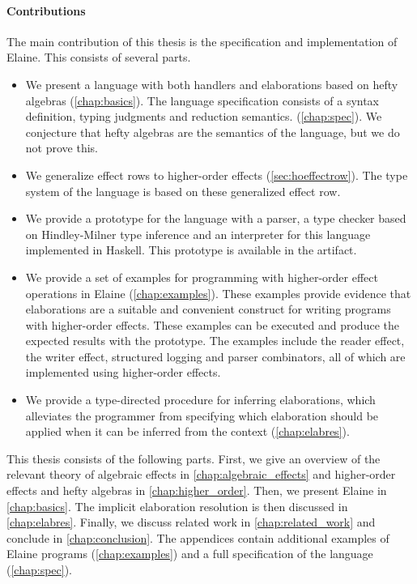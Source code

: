 \paragraph{Contributions} The main contribution of this thesis is the specification and implementation of Elaine. This consists of several parts.
%
\begin{itemize}
    \item We present a language with both handlers and elaborations based on hefty algebras (\cref{chap:basics}). The language specification consists of a syntax definition, typing judgments and reduction semantics. (\cref{chap:spec}). We conjecture that hefty algebras are the semantics of the language, but we do not prove this.
    \item We generalize effect rows to higher-order effects (\cref{sec:hoeffectrow}). The type system of the language is based on these generalized effect row.
    \item We provide a prototype for the language with a parser, a type checker based on Hindley-Milner type inference and an interpreter for this language implemented in Haskell. This prototype is available in the artifact.
    \item We provide a set of examples for programming with higher-order effect operations in Elaine (\cref{chap:examples}). These examples provide evidence that elaborations are a suitable and convenient construct for writing programs with higher-order effects. These examples can be executed and produce the expected results with the prototype. The examples include the reader effect, the writer effect, structured logging and parser combinators, all of which are implemented using higher-order effects.
    \item We provide a type-directed procedure for inferring elaborations, which alleviates the programmer from specifying which elaboration should be applied when it can be inferred from the context (\cref{chap:elabres}).
\end{itemize}
%
This thesis consists of the following parts. First, we give an overview of the relevant theory of algebraic effects in \cref{chap:algebraic_effects} and higher-order effects and hefty algebras in \cref{chap:higher_order}. Then, we present Elaine in \cref{chap:basics}. The implicit elaboration resolution is then discussed in \cref{chap:elabres}. Finally, we discuss related work in \cref{chap:related_work} and conclude in \cref{chap:conclusion}. The appendices contain additional examples of Elaine programs (\cref{chap:examples}) and a full specification of the language (\cref{chap:spec}).

